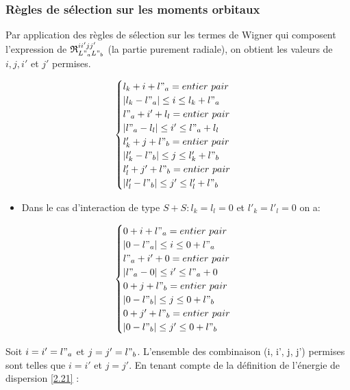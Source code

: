 \subsubsection{Règles de sélection sur les moments orbitaux}

Par application des règles de sélection sur les termes de Wigner qui composent l'expression de $\mathfrak{R}_{L"_{a} L"_{b}}^{ii'jj'}$ (la partie purement radiale), on obtient les valeurs de $i, j, i'$ et $j'$ permises. 


\begin{equation}
\begin{cases}
l_{k} + i + l"_{a} = entier\ pair \\
|l_{k} - l"_{a}| \leq i \leq l_{k} + l"_{a} \\
l"_{a} + i' + l_{l} = entier\ pair \\
|l"_{a} - l_{l}| \leq i' \leq l"_{a} + l_{l} \\
l'_{k} + j + l"_{b} = entier\ pair \\
|l'_{k} - l"_{b}| \leq j \leq l'_{k} + l"_{b} \\
l'_{l} + j' + l"_{b} = entier\ pair \\
|l'_{l} - l"_{b}| \leq j' \leq l'_{l} + l"_{b}
\end{cases}
\end{equation}

\begin{itemize}
	\item Dans le cas d'interaction de type $S + S : l_{k} = l_{l} = 0$ et $l'_{k} = l'_{l} = 0$ on a:
\end{itemize}

\begin{equation}
\begin{cases}
0 + i + l"_{a} = entier\ pair \\
|0 - l"_{a}| \leq i \leq 0 + l"_{a} \\
l"_{a} + i' + 0 = entier\ pair \\
|l"_{a} - 0| \leq i' \leq l"_{a} + 0 \\
0 + j + l"_{b} = entier\ pair \\
|0 - l"_{b}| \leq j \leq 0 + l"_{b} \\
0 + j' + l"_{b} = entier\ pair \\
|0 - l"_{b}| \leq j' \leq 0 + l"_{b}
\end{cases}
\end{equation}

Soit $i = i' = l"_{a}$ et $j = j' = l"_{b}$. L'ensemble des combinaison (i, i', j, j') permises sont telles que $i = i'$ et $j = j'$. En tenant compte de la définition de l'énergie de dispersion \ref{2.21} : 

